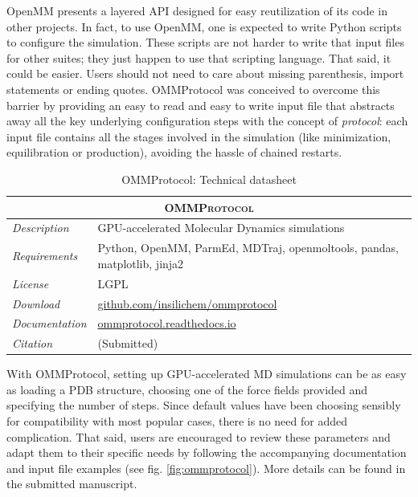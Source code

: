 OpenMM presents a layered API designed for easy reutilization of its code in other projects. In fact, to use OpenMM, one is expected to write Python scripts to configure the simulation. These scripts are not harder to write that input files for other suites; they just happen to use that scripting language. That said, it could be easier. Users should not need to care about missing parenthesis, import statements or ending quotes. OMMProtocol was conceived to overcome this barrier by providing an easy to read and easy to write input file that abstracts away all the key underlying configuration steps with the concept of \textit{protocol}: each input file contains all the stages involved in the simulation (like minimization, equilibration or production), avoiding the hassle of chained restarts.

\begin{table}[hbtp]
	\caption{OMMProtocol: Technical datasheet}
	\footnotesize
	\newcommand{\tableheading}[1]{\multicolumn{2}{c}{\textsc{#1}}}
	\begin{tabularx}{\textwidth}{RL}
		\toprule
		\tableheading{OMMProtocol}\\
		\toprule
		\textit{Description} & GPU-accelerated Molecular Dynamics simulations \\
		\midrule
		\textit{Requirements} & Python, OpenMM, ParmEd, MDTraj, openmoltools, pandas, matplotlib, jinja2 \\
		\midrule
		\textit{License} & LGPL \\
		\midrule
		\textit{Download} & \href{https://github.com/insilichem/ommprotocol}{github.com/insilichem/ommprotocol} \\
		\midrule
		\textit{Documentation} & \href{http://ommprotocol.readthedocs.io}{ommprotocol.readthedocs.io} \\
		\midrule
		\textit{Citation} & (Submitted) \\
		\bottomrule

	\end{tabularx}
\end{table}

With OMMProtocol, setting up GPU-accelerated MD simulations can be as easy as loading a PDB structure, choosing one of the force fields provided and specifying the number of steps. Since default values have been choosing sensibly for compatibility with most popular cases, there is no need for added complication. That said, users are encouraged to review these parameters and adapt them to their specific needs by following the accompanying documentation and input file examples (see fig. \ref{fig:ommprotocol}). More details can be found in the submitted manuscript.\cite{ommprotocol}

